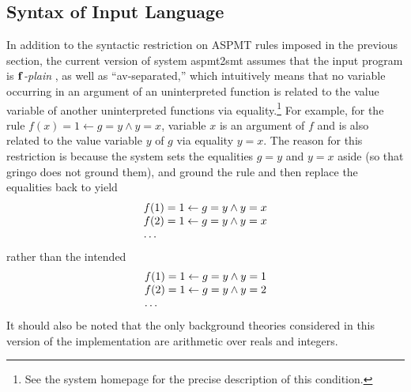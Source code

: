 \documentclass[runningheads]{llncs}
\def\ba{\begin{array}}
\def\ea{\end{array}}
\begin{document}
\subsection{Syntax of Input Language}

In addition to the syntactic restriction on ASPMT rules imposed in the previous section, the current version of system {\sc aspmt2smt} 
assumes that the input program is {\em ${\bf f}$-plain}
\cite{bartholomew12stable}, as well as ``av-separated,'' which intuitively 
means that no variable occurring in
an argument of an uninterpreted function is related to the value
variable of another uninterpreted functions via equality.\footnote{See
  the system homepage
  for the precise description of this condition.} For example, 
for the rule $f(x) = 1 \leftarrow g = y \land y = x$, variable $x$ is
an argument of $f$ and is also related to the value variable $y$ of $g$
via equality $y=x$.
The reason for this restriction is because the system sets the
equalities $g=y$ and $y = x$ aside (so that {\sc gringo} does not
ground them), and ground the rule and then
replace the equalities back to yield
\[
\ba l
f(1) = 1 \leftarrow g = y \land y = x \\
f(2) = 1 \leftarrow g = y \land y = x \\
\dots
\ea
\]
rather than the intended
\[
\ba l
f(1) = 1 \leftarrow g = y \land y = 1 \\
f(2) = 1 \leftarrow g = y \land y = 2 \\
\dots
\ea
\]
It should also be noted that the only background theories considered
in this version of the implementation are arithmetic over reals and
integers. 




\end{document}
